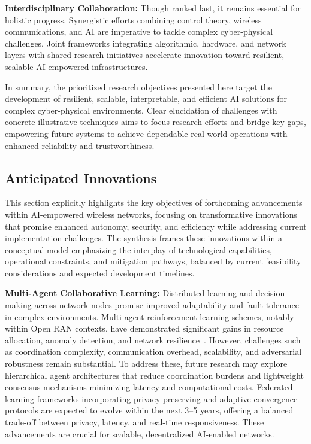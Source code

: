 \documentclass[sigconf]{acmart}
\begin{document}
\textbf{Interdisciplinary Collaboration:} Though ranked last, it remains essential for holistic progress. Synergistic efforts combining control theory, wireless communications, and AI are imperative to tackle complex cyber-physical challenges. Joint frameworks integrating algorithmic, hardware, and network layers with shared research initiatives accelerate innovation toward resilient, scalable AI-empowered infrastructures.

In summary, the prioritized research objectives presented here target the development of resilient, scalable, interpretable, and efficient AI solutions for complex cyber-physical environments. Clear elucidation of challenges with concrete illustrative techniques aims to focus research efforts and bridge key gaps, empowering future systems to achieve dependable real-world operations with enhanced reliability and trustworthiness.

\subsection{Anticipated Innovations}

This section explicitly highlights the key objectives of forthcoming advancements within AI-empowered wireless networks, focusing on transformative innovations that promise enhanced autonomy, security, and efficiency while addressing current implementation challenges. The synthesis frames these innovations within a conceptual model emphasizing the interplay of technological capabilities, operational constraints, and mitigation pathways, balanced by current feasibility considerations and expected development timelines.

\textbf{Multi-Agent Collaborative Learning:} Distributed learning and decision-making across network nodes promise improved adaptability and fault tolerance in complex environments. Multi-agent reinforcement learning schemes, notably within Open RAN contexts, have demonstrated significant gains in resource allocation, anomaly detection, and network resilience~\cite{ref49,ref54}. However, challenges such as coordination complexity, communication overhead, scalability, and adversarial robustness remain substantial. To address these, future research may explore hierarchical agent architectures that reduce coordination burdens and lightweight consensus mechanisms minimizing latency and computational costs. Federated learning frameworks incorporating privacy-preserving and adaptive convergence protocols are expected to evolve within the next 3–5 years, offering a balanced trade-off between privacy, latency, and real-time responsiveness. These advancements are crucial for scalable, decentralized AI-enabled networks.
\end{document}
